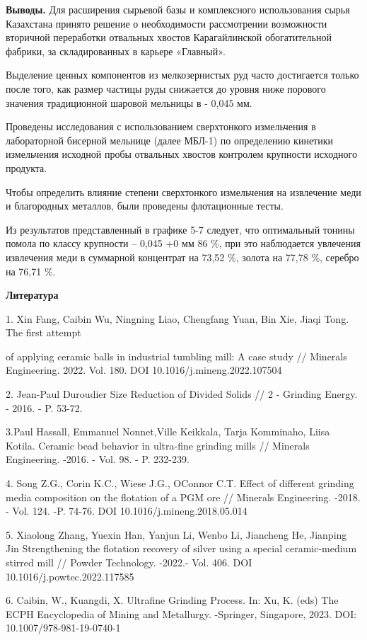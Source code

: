 {\bfseries Выводы.} Для расширения сырьевой базы и комплексного
использования сырья Казахстана принято решение о необходимости
рассмотрении возможности вторичной переработки отвальных хвостов
Карагайлинской обогатительной фабрики, за складированных в карьере
«Главный».

Выделение ценных компонентов из мелкозернистых руд часто достигается
только после того, как размер частицы руды снижается до уровня ниже
порового значения традиционной шаровой мельницы в - 0,045 мм.

Проведены исследования с использованием сверхтонкого измельчения в
лабораторной бисерной мельнице (далее МБЛ-1) по определению кинетики
измельчения исходной пробы отвальных хвостов контролем крупности
исходного продукта.

Чтобы определить влияние степени сверхтонкого измельчения на извлечение
меди и благородных металлов, были проведены флотационные тесты.

Из результатов представленный в графике 5-7 следует, что оптимальный
тонины помола по классу крупности -- 0,045 +0 мм 86 \%, при это
наблюдается увлечения извлечения меди в суммарной концентрат на 73,52
\%, золота на 77,78 \%, серебро на 76,71 \%.

{\bfseries Литература}

1. Xin Fang, Caibin Wu, Ningning Liao, Chengfang Yuan, Bin Xie, Jiaqi
Tong. The first attempt

of applying ceramic balls in industrial tumbling mill: A case study //
Minerals Engineering. 2022. Vol. 180. DOI 10.1016/j.mineng.2022.107504

2. Jean-Paul Duroudier Size Reduction of Divided Solids // 2 - Grinding
Energy. - 2016. - P. 53-72.

3.Paul Hassall, Emmanuel Nonnet,Ville Keikkala, Tarja Komminaho, Liisa
Kotila. Ceramic bead behavior in ultra-fine grinding mills // Minerals
Engineering. -2016. - Vol. 98. - P. 232-239.

4. Song Z.G., Corin K.C., Wiese J.G., O\textquotesingle Connor C.T.
Effect of different grinding media composition on the flotation of a PGM
ore // Minerals Engineering. -2018. - Vol. 124. -P. 74-76. DOI
10.1016/j.mineng.2018.05.014

5. Xiaolong Zhang, Yuexin Han, Yanjun Li, Wenbo Li, Jiancheng He,
Jianping Jin Strengthening the flotation recovery of silver using a
special ceramic-medium stirred mill // Powder Technology. -2022.- Vol.
406. DOI 10.1016/j.powtec.2022.117585

6. Caibin, W., Kuangdi, X. Ultrafine Grinding Process. In: Xu, K. (eds)
The ECPH Encyclopedia of Mining and Metallurgy. -Springer, Singapore,
2023. DOI: 10.1007/978-981-19-0740-1

